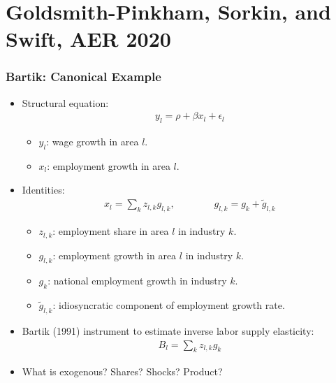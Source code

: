 \documentclass[english,xcolor=svgnames]{beamer}
\begin{document}
\section{Goldsmith-Pinkham, Sorkin, and Swift, AER 2020}

\begin{frame}
\frametitle[alignment=center]{Bartik: Canonical Example}
\begin{itemize}
	\item Structural equation:
	\begin{align*}
		y_l = \rho +\beta x_l + \epsilon_l
	\end{align*}
	\begin{itemize}
		\item $y_l$: wage growth in area $l$.
		\item $x_l$: employment growth in area $l$.
	\end{itemize}
	\item Identities:
	\begin{align*}
		x_l = \sum_k z_{l,k} g_{l,k}, \qquad\qquad g_{l,k} = g_k + \tilde{g}_{l,k}
	\end{align*}
	\begin{itemize}
		\item $z_{l,k}$: employment share in area $l$ in industry $k$.
		\item $g_{l,k}$: employment growth in area $l$ in industry $k$.
		\item $g_{k}$: national employment growth in industry $k$.
		\item $\tilde{g}_{l,k}$:  idiosyncratic component of employment growth rate.
	\end{itemize}
	\item Bartik (1991) instrument to estimate inverse labor supply elasticity:
	\begin{align*}
		B_l = \sum_k z_{l,k}g_k
	\end{align*}
	\item What is exogenous? Shares? Shocks? Product?
\end{itemize}
\end{frame}
\end{document}
